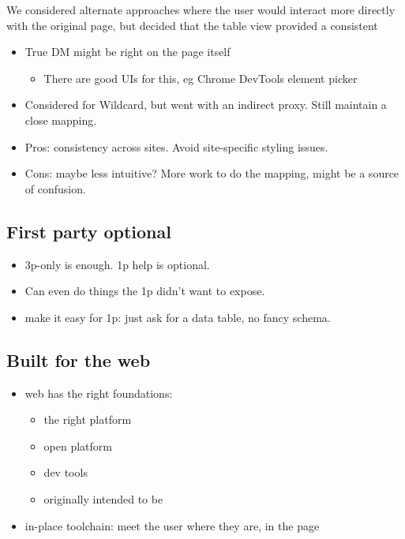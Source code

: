 \documentclass[english,submission]{programming}
\providecommand{\tightlist}{%
  \setlength{\itemsep}{0pt}\setlength{\parskip}{0pt}}
\begin{document}
We considered alternate approaches where the user would interact more
directly with the original page, but decided that the table view
provided a consistent

\begin{itemize}
\tightlist
\item
  True DM might be right on the page itself

  \begin{itemize}
  \tightlist
  \item
    There are good UIs for this, eg Chrome DevTools element picker
  \end{itemize}
\item
  Considered for Wildcard, but went with an indirect proxy. Still
  maintain a close mapping.
\item
  Pros: consistency across sites. Avoid site-specific styling issues.
\item
  Cons: maybe less intuitive? More work to do the mapping, might be a
  source of confusion.
\end{itemize}

\hypertarget{first-party-optional}{%
\subsection{First party optional}\label{first-party-optional}}

\begin{itemize}
\tightlist
\item
  3p-only is enough. 1p help is optional.
\item
  Can even do things the 1p didn't want to expose.
\item
  make it easy for 1p: just ask for a data table, no fancy schema.
\end{itemize}

\hypertarget{built-for-the-web}{%
\subsection{Built for the web}\label{built-for-the-web}}

\begin{itemize}
\tightlist
\item
  web has the right foundations:

  \begin{itemize}
  \tightlist
  \item
    the right platform
  \item
    open platform
  \item
    dev tools
  \item
    originally intended to be
  \end{itemize}
\item
  in-place toolchain: meet the user where they are, in the page
\end{itemize}
\end{document}
